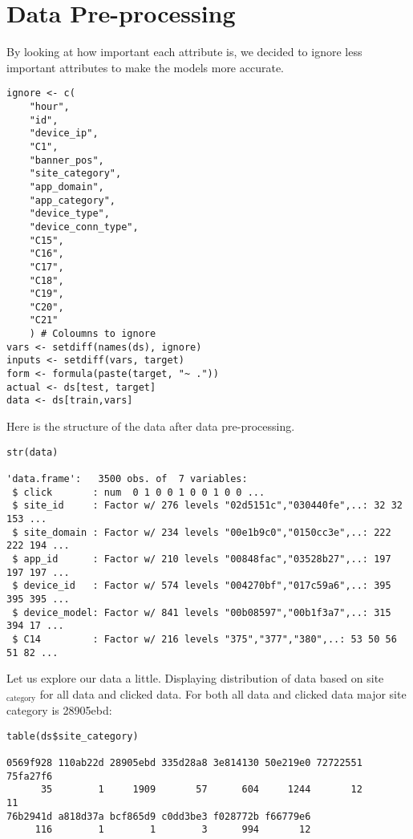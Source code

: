 \documentclass[11pt,a4paper]{article}
\begin{document}
\section{Data Pre-processing}
\label{sec-3}
By looking at how important each attribute is, we decided to ignore 
less important attributes to make the models more accurate.

\begin{verbatim}
ignore <- c(
    "hour", 
    "id",
    "device_ip",
    "C1",
    "banner_pos",
    "site_category",
    "app_domain",
    "app_category",
    "device_type",
    "device_conn_type",
    "C15",
    "C16",
    "C17",
    "C18",
    "C19",
    "C20",
    "C21"
    ) # Coloumns to ignore
vars <- setdiff(names(ds), ignore)
inputs <- setdiff(vars, target)
form <- formula(paste(target, "~ ."))
actual <- ds[test, target]
data <- ds[train,vars]
\end{verbatim}

Here is the structure of the data after data pre-processing.

\begin{verbatim}
str(data)

'data.frame':   3500 obs. of  7 variables:
 $ click       : num  0 1 0 0 1 0 0 1 0 0 ...
 $ site_id     : Factor w/ 276 levels "02d5151c","030440fe",..: 32 32 153 ...
 $ site_domain : Factor w/ 234 levels "00e1b9c0","0150cc3e",..: 222 222 194 ...
 $ app_id      : Factor w/ 210 levels "00848fac","03528b27",..: 197 197 197 ...
 $ device_id   : Factor w/ 574 levels "004270bf","017c59a6",..: 395 395 395 ...
 $ device_model: Factor w/ 841 levels "00b08597","00b1f3a7",..: 315 394 17 ...
 $ C14         : Factor w/ 216 levels "375","377","380",..: 53 50 56 51 82 ...
\end{verbatim}

Let us explore our data a little.
Displaying distribution of data based on site$_{\text{category}}$ for all data and clicked data. 
For both all data and clicked data major site category is 28905ebd:

\begin{verbatim}
table(ds$site_category)

0569f928 110ab22d 28905ebd 335d28a8 3e814130 50e219e0 72722551 75fa27f6 
      35        1     1909       57      604     1244       12       11 
76b2941d a818d37a bcf865d9 c0dd3be3 f028772b f66779e6 
     116        1        1        3      994       12
\end{verbatim}
\end{document}
